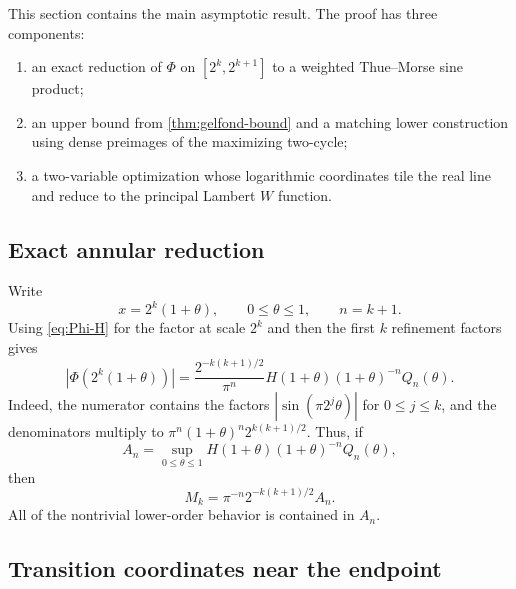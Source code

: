\documentclass[11pt,oneside]{article}
\theoremstyle{definition}
\theoremstyle{remark}
\newcommand{\PhiF}{\Phi}
\begin{document}
This section contains the main asymptotic result.  The proof has three
components:
\begin{enumerate}
 \item an exact reduction of \(\PhiF\) on \([2^k,2^{k+1}]\) to a weighted
 Thue--Morse sine product;
 \item an upper bound from \cref{thm:gelfond-bound} and a matching lower
 construction using dense preimages of the maximizing two-cycle;
 \item a two-variable optimization whose logarithmic coordinates tile the
 real line and reduce to the principal Lambert \(W\) function.
\end{enumerate}

\subsection{Exact annular reduction}

Write
\[
 x=2^k(1+\theta),
 \qquad 0\le\theta\le1,
 \qquad n=k+1.
\]
Using \eqref{eq:Phi-H} for the factor at scale \(2^k\) and then the first
\(k\) refinement factors gives
\begin{equation}
 |\PhiF(2^k(1+\theta))|
 =\frac{2^{-k(k+1)/2}}{\pi^n}
 H(1+\theta)(1+\theta)^{-n}Q_n(\theta).
 \label{eq:annulus-exact}
\end{equation}
Indeed, the numerator contains the factors
\(
 |\sin(\pi2^j\theta)|
\)
for \(0\le j\le k\), and the denominators multiply to
\(
 \pi^n(1+\theta)^n2^{k(k+1)/2}.
\)
Thus, if
\begin{equation}
 A_n=\sup_{0\le\theta\le1}
 H(1+\theta)(1+\theta)^{-n}Q_n(\theta),
 \label{eq:An-definition}
\end{equation}
then
\begin{equation}
 M_k=\pi^{-n}2^{-k(k+1)/2}A_n.
 \label{eq:Mk-An}
\end{equation}
All of the nontrivial lower-order behavior is contained in \(A_n\).

\subsection{Transition coordinates near the endpoint}
\end{document}
